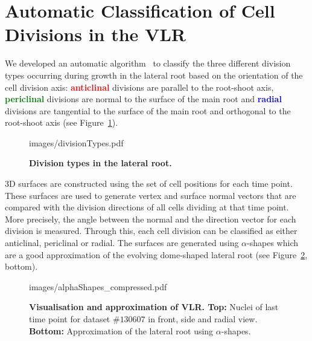\documentclass[11pt,a4paper, final]{article}
\begin{document}
\section{Automatic Classification of Cell Divisions in the VLR}
\label{sec:divisionTypes}
\noindent
We developed an automatic algorithm~\cite[chapter 4]{FangerauDiss_2015} to classify the three different division types occurring during growth in the lateral root based on the orientation of the cell division axis: \textcolor{red}{\textbf{anticlinal}} divisions are parallel to the root-shoot axis, \textcolor{green}{\textbf{periclinal}} divisions are normal to the surface of the main root and \textcolor{blue}{\textbf{radial}} divisions are tangential to the surface of the main root and orthogonal to the root-shoot axis (see Figure~\ref{fig:divisionTypes}).
%
\begin{figure}[htbp]
	\begin{center}
		\begin{overpic}[width=0.8\linewidth]{images/divisionTypes.pdf}
		\end{overpic}
\caption[]
{
{\bf Division types in the lateral root.}
}
	\label{fig:divisionTypes}
	\end{center}
\end{figure}
%
3D surfaces are constructed using the set of cell positions for each time point. These surfaces are used to generate vertex and surface normal vectors that are compared with the division directions of all cells dividing at that time point. More precisely, the angle between the normal and the direction vector for each division is measured. Through this, each cell division can be classified as either anticlinal, periclinal or radial. The surfaces are generated using $\alpha$-shapes which are a good approximation of the evolving dome-shaped lateral root (see Figure~\ref{fig:alphaShapes}, bottom).
%
\begin{figure}[htbp]
	\begin{center}
		\begin{overpic}[width=1.\linewidth]{images/alphaShapes_compressed.pdf}
		\end{overpic}
\caption[]
{
{\bf Visualisation and approximation of VLR. Top:} Nuclei of last time point for dataset $\# 130607$ in front, side and radial view. {\bf Bottom:} Approximation of the lateral root using $\alpha$-shapes.
}
	\label{fig:alphaShapes}
	\end{center}
\end{figure}
%
\end{document}
